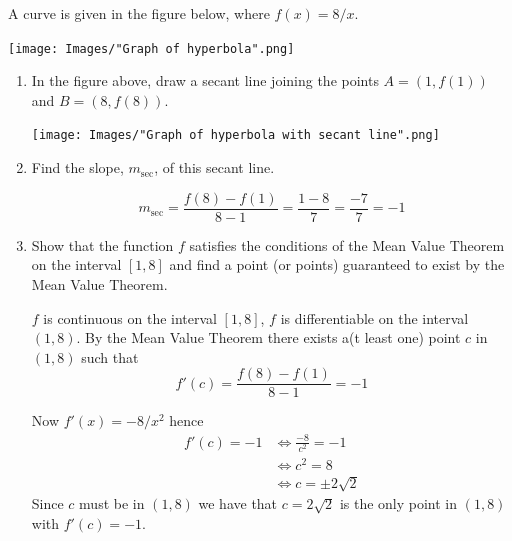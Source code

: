 \documentclass[nooutcomes,handout]{ximera}
\begin{document}
\begin{problem}
  A curve is given in the figure below, where $f(x) = 8/x$.
  \begin{image}
     \texttt{[image: Images/"Graph of hyperbola".png]}
  \end{image}
  \begin{enumerate}
    \item

      In the figure above, draw a secant line joining the points $A = (1, f(1))$ and $B = (8, f(8))$.
        \begin{image}
     \texttt{[image: Images/"Graph of hyperbola with secant line".png]}
  \end{image}
     \item
      Find the slope, $m_{\text{sec}}$, of this secant line.
      \begin{freeResponse}

          $$m_{\text{sec}} = \frac{f(8) - f(1)}{8 - 1}= \frac{1 - 8}{7} = \frac{-7}{7} = -1$$

      \end{freeResponse}

    \item
      Show that the function $f$ satisfies the conditions of the Mean Value Theorem on the interval $[1, 8]$ and find a point (or points) guaranteed to exist by the Mean Value Theorem.
      \begin{freeResponse}
        $f$ is continuous on the interval $[1, 8]$, $f$ is differentiable on the interval $(1, 8)$.
        By the Mean Value Theorem there exists a(t least one) point $c$ in $(1, 8)$ such that
        \[
          f'(c) = \frac{f(8) - f(1)}{8 - 1} = -1
        \]

        Now $f'(x) = -8/x^2$ hence
        \begin{align*}
          f'(c) = -1 &\iff \frac{-8}{c^2} = -1 \\
                     &\iff c^2 = 8 \\
                     &\iff c= \pm 2\sqrt{2}
        \end{align*}
        Since $c$ must be in $(1, 8)$ we have that $c = 2\sqrt{2}$ is the only point in $(1, 8)$ with $f'(c) = -1$.
      \end{freeResponse}

  \end{enumerate}
\end{problem}
\end{document}
